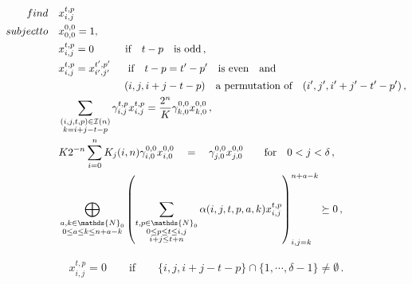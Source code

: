 \documentclass[10pt,a4paper]{amsart}
\newcommand{\II}{\mathcal{I}}
\newcommand{\N}{\mathds{N}}
\newcommand{\nn}{\nonumber}
\begin{document}
\begin{align}\label{eq:sdpx_relax}
	\textnormal{find} 		\quad & x^{t,p}_{i,j}  \nn \\
	\textnormal{subject to} 	\quad
	&  x^{0,0}_{0,0}=1, \nn \\
    &x^{t,p}_{i,j}=0 \quad\quad\quad \text{if}\quad  t-p \quad  \text{is odd}\,,\nn \\
	& x^{t,p}_{i,j}=x^{t',p'}_{i',j'}\,\,\,\, \quad \text{if} \quad  t-p=t'-p' \quad \text{is even} \quad \text{and} \nn \\
	&\quad\quad\quad\quad\quad\quad\,\, (i,j,i+j-t-p) \quad\text{a permutation of} \quad(i',j',i'+j'-t'-p')\,, \nn \\
	& \sum_{\substack{(i,j,t,p)\in \II(n) \\ k=i+j-t-p}}  \gamma^{t,p}_{i,j} x^{t,p}_{i,j}=\frac{2^n}{K} \gamma^{0,0}_{k,0} x^{0,0}_{k,0}   \,, \nn\\
	& K2^{-n}\sum^n_{i=0} K_j(i,n) \gamma^{0,0}_{i,0} x^{0,0}_{i,0}\quad = \quad \gamma^{0,0}_{j,0} x^{0,0}_{j,0} \quad\quad \text{for} \quad 0<j<\delta \,, \nn \\
	&\bigoplus_{\substack{a,k \in \N_0\\ 0\leq a\leq k\leq n+a-k}} \left(\sum\limits_{\substack{t,p\in \N_0 \\ 0 \leq p \leq t \leq i,j \\ i+j\leq t+n}}\alpha(i,j,t,p,a,k)x_{i,j}^{t,p}\right)_{i,j=k}^{n+a-k}   \succeq 0\,,
\end{align}

\begin{align}\label{eq:klred_pure_xijtp}
x^{t,p}_{i,j}=0 \quad\quad \text{if} \quad\quad \{i,j,i+j-t-p\} \cap \{1,\cdots, \delta-1\} \neq \emptyset\,.
\end{align}
\end{document}
